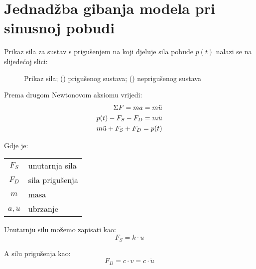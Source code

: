\section{Jednadžba gibanja modela pri sinusnoj pobudi}
Prikaz sila za sustav s prigušenjem na koji djeluje sila pobude $p(t)$ nalazi se 
na slijedećoj slici:

\begin{figure}[H]
    \begin{subfigure}[b][][l]{0.5\textwidth}
        
        \caption{}
        \label{fig:sile-priguseni-ekvivalentni-sustav-sdf}
    \end{subfigure}
    \hfill
    \begin{subfigure}[b][][r]{0.5\textwidth}
        
        \caption{}
        \label{fig:sile-nepriguseni-ekvivalentni-sustav-sdf}
    \end{subfigure}
    \caption{Prikaz sila;
        ()
            prigušenog sustava; 
    ()
            neprigušenog sustava}
    \label{fig:dijagrami_sila}
\end{figure}


Prema drugom Newtonovom aksiomu vrijedi:
\begin{align}
    \Sigma F = ma = m\ddot{u}\notag\\
        p(t) - F_S - F_D = m\ddot{u} \notag\\
        m\ddot{u} + F_S + F_D = p(t) \label{eq:newton}
\end{align}

Gdje je:\\
\begin{table}[H]
\begin{tabular}{c l}
	$F_S$ & unutarnja sila \\
	$F_D$ & sila prigušenja \\
	$m$   & masa \\
        $a,\ddot{u}$   & ubrzanje\\
\end{tabular}
\end{table}

Unutarnju silu možemo zapisati kao:
\begin{equation}
	F_S = k \cdot u \label{eq:hooke}
\end{equation}

A silu prigušenja kao:
\begin{equation}
	F_D = c \cdot v = c \cdot \dot{u} \label{eq:prigusenje}
\end{equation}

